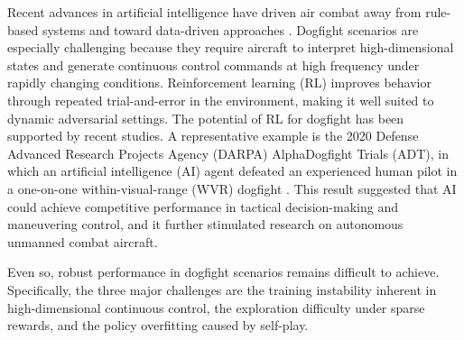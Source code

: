 \documentclass[pdflatex,sn-mathphys-num]{sn-jnl}%
\theoremstyle{thmstyleone}%
\theoremstyle{thmstyletwo}%
\theoremstyle{thmstylethree}%
\begin{document}
Recent advances in artificial intelligence have driven air combat away from rule-based systems and toward data-driven approaches \cite{Strand_2025}. Dogfight scenarios are especially challenging because they require aircraft to interpret high-dimensional states and generate continuous control commands at high frequency under rapidly changing conditions. Reinforcement learning (RL) improves behavior through repeated trial-and-error in the environment, making it well suited to dynamic adversarial settings. The potential of RL for dogfight has been supported by recent studies. A representative example is the 2020 Defense Advanced Research Projects Agency (DARPA) AlphaDogfight Trials (ADT), in which an artificial intelligence (AI) agent defeated an experienced human pilot in a one-on-one within-visual-range (WVR) dogfight \cite{pope_hierarchical_2023}. This result suggested that AI could achieve competitive performance in tactical decision-making and maneuvering control, and it further stimulated research on autonomous unmanned combat aircraft.


Even so, robust performance in dogfight scenarios remains difficult to achieve. Specifically, the three major challenges are the training instability inherent in high-dimensional continuous control, the exploration difficulty under sparse rewards, and the policy overfitting caused by self-play.
\end{document}

